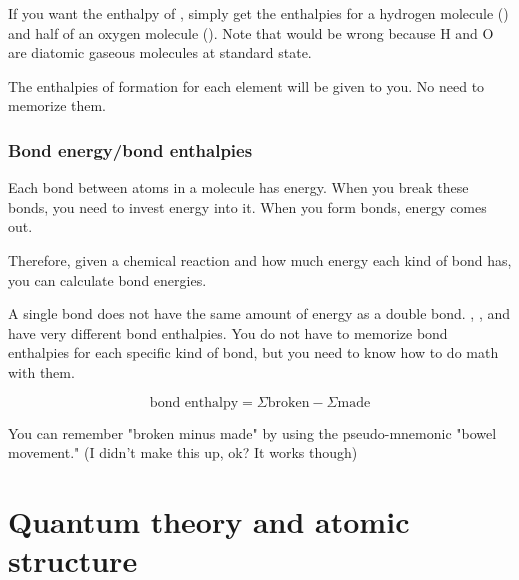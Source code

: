 \documentclass[letterpaper, 12pt]{article}
\begin{document}
If you want the enthalpy of , simply get the enthalpies for a hydrogen molecule () and half of an oxygen molecule (). Note that  would be wrong because H and O are diatomic gaseous molecules at standard state.

The enthalpies of formation for each element will be given to you. No need to memorize them.

\section{Bond energy/bond enthalpies}
Each bond between atoms in a molecule has energy. When you break these bonds, you need to invest energy into it. When you form bonds, energy comes out.

Therefore, given a chemical reaction and how much energy each kind of bond has, you can calculate bond energies.

A single bond does not have the same amount of energy as a double bond. , , and  have very different bond enthalpies. You do not have to memorize bond enthalpies for each specific kind of bond, but you need to know how to do math with them.

$$\text{bond enthalpy} = \Sigma \text{broken} - \Sigma \text{made}$$

You can remember "broken minus made" by using the pseudo-mnemonic "bowel movement." (I didn't make this up, ok? It works though)

\clearpage
	
\part{Quantum theory and atomic structure}
\end{document}
